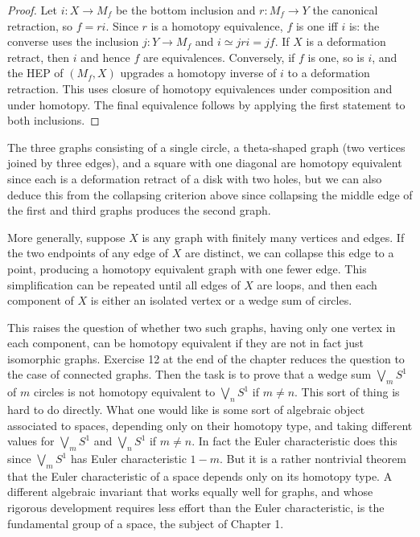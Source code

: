 \begin{proof}

\sketch Let $i:X\to M_f$ be the bottom inclusion and $r:M_f\to Y$ the canonical
retraction, so $f=ri$. Since $r$ is a homotopy equivalence, $f$ is one iff $i$ is:
the converse uses the inclusion $j:Y\to M_f$ and $i\simeq jri=jf$. If $X$ is a
deformation retract, then $i$ and hence $f$ are equivalences. Conversely, if $f$ is
one, so is $i$, and the HEP of $(M_f,X)$ upgrades a homotopy inverse of $i$ to a
deformation retraction. This uses closure of homotopy equivalences under composition
and under homotopy. The final equivalence follows by applying the first statement to
both inclusions.
\end{proof}

\begin{example}
\label{ex:graphs-collapsing-homotopy-equivalent}
The three graphs consisting of a single circle, a theta-shaped graph (two vertices
joined by three edges), and a square with one diagonal are homotopy equivalent since
each is a deformation retract of a disk with two holes, but we can also deduce this
from the collapsing criterion above since collapsing the middle edge of the first and
third graphs produces the second graph.

More generally, suppose $X$ is any graph with finitely many vertices and edges. If
the two endpoints of any edge of $X$ are distinct, we can collapse this edge to a point,
producing a homotopy equivalent graph with one fewer edge. This simplification can
be repeated until all edges of $X$ are loops, and then each component of $X$ is either
an isolated vertex or a wedge sum of circles.

This raises the question of whether two such graphs, having only one vertex in each
component, can be homotopy equivalent if they are not in fact just isomorphic graphs.
Exercise 12 at the end of the chapter reduces the question to the case of connected
graphs. Then the task is to prove that a wedge sum $\bigvee_m S^1$ of $m$ circles is not
homotopy equivalent to $\bigvee_n S^1$ if $m \ne n$. This sort of thing is hard to do directly.
What one would like is some sort of algebraic object associated to spaces, depending
only on their homotopy type, and taking different values for $\bigvee_m S^1$ and $\bigvee_n S^1$
if $m \ne n$. In fact the Euler characteristic does this since $\bigvee_m S^1$ has Euler
characteristic $1-m$. But it is a rather nontrivial theorem that the Euler characteristic
of a space depends only on its homotopy type. A different algebraic invariant that
works equally well for graphs, and whose rigorous development requires less effort
than the Euler characteristic, is the fundamental group of a space, the subject of
Chapter 1.
\end{example}

